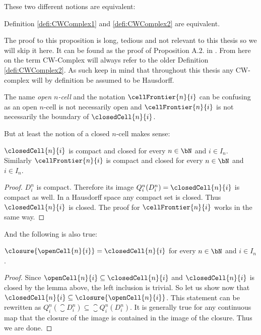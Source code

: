 These two different notions are equivalent:

\begin{prop}
    Definition \ref{defi:CWComplex1} and \ref{defi:CWComplex2} are equivalent.
\end{prop}

The proof to this proposition is long, tedious and not relevant to this thesis so we will skip it here.
It can be found as the proof of Proposition A.2. in \cite{Hatcher2001}.
From here on the term CW-Complex will always refer to the older Definition \ref{defi:CWComplex2}.
As such keep in mind that throughout this thesis any CW-complex will by definition be assumed to be Hausdorff.

\begin{rem}
    The name \emph{open $n$-cell} and the notation $\cellFrontier{n}{i}$ can be confusing as an open $n$-cell is not necessarily open and $\cellFrontier{n}{i}$  is not necessarily the boundary of $\closedCell{n}{i}$.
\end{rem}

But at least the notion of a closed $n$-cell makes sense:

\begin{lem}\label{lem:closedCellclosed}
    $\closedCell{n}{i}$ is compact and closed for every $n \in \bN$ and $i \in I_n$.
    Similarly $\cellFrontier{n}{i}$ is compact and closed for every $n \in \bN$ and $i \in I_n$.
\end{lem}
\begin{proof}
    $D_i^n$ is compact.
    Therefore its image $Q_i^n(D_i^n) = \closedCell{n}{i}$ is compact as well.
    In a Hausdorff space any compact set is closed.
    Thus $\closedCell{n}{i}$ is closed.
    The proof for $\cellFrontier{n}{i}$ works in the same way.
\end{proof}

And the following is also true:

\begin{lem}\label{lem:closureopencell}
    $\closure{\openCell{n}{i}} = \closedCell{n}{i}$ for every $n \in \bN$ and $i \in I_n$.
\end{lem}
\begin{proof}
    Since $\openCell{n}{i} \subseteq \closedCell{n}{i}$ and $\closedCell{n}{i}$ is closed by the lemma above, the left inclusion is trivial.
    So let us show now that $\closedCell{n}{i} \subseteq \closure{\openCell{n}{i}}$.
    This statement can be rewritten as $Q_i^n \left ( \closure{D_i^n} \right ) \subseteq \closure{Q_i^n(D_i^n)}$.
    It is generally true for any continuous map that the closure of the image is contained in the image of the closure.
    Thus we are done.
\end{proof}


